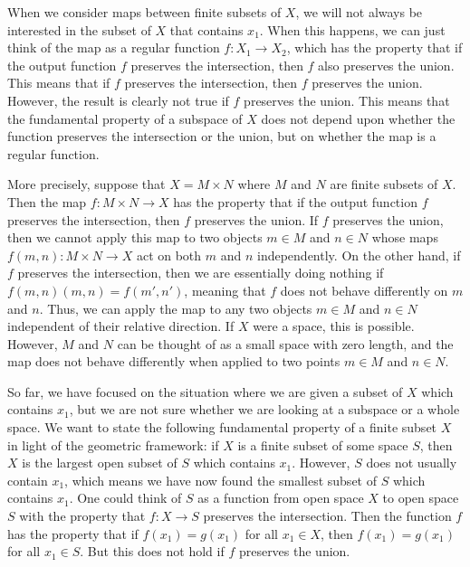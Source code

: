 \documentclass[a4paper,reqno,oneside]{article}
\begin{document}
When we consider maps between finite subsets of $X$, we will not always be interested in the subset of $X$ that contains $x_1$. When this happens, we can just think of the map as a regular function $f: X_1 \to X_2$, which has the property that if the output function $f$ preserves the intersection, then $f$ also preserves the union. This means that if $f$ preserves the intersection, then $f$ preserves the union. However, the result is clearly not true if $f$ preserves the union. This means that the fundamental property of a subspace of $X$ does not depend upon whether the function preserves the intersection or the union, but on whether the map is a regular function.  

More precisely, suppose that $X = M \times N$ where $M$ and $N$ are finite subsets of $X$. Then the map $f: M \times N \to X$ has the property that if the output function $f$ preserves the intersection, then $f$ preserves the union. If $f$ preserves the union, then we cannot apply this map to two objects $m \in M$ and $n \in N$ whose maps $f(m,n): M \times N \to X$ act on both $m$ and $n$ independently. On the other hand, if $f$ preserves the intersection, then we are essentially doing nothing if $f(m,n)(m,n) = f(m',n')$, meaning that $f$ does not behave differently on $m$ and $n$. Thus, we can apply the map to any two objects $m \in M$ and $n \in N$ independent of their relative direction. If $X$ were a space, this is possible. However, $M$ and $N$ can be thought of as a small space with zero length, and the map does not behave differently when applied to two points $m \in M$ and $n \in N$. 

So far, we have focused on the situation where we are given a subset of $X$ which contains $x_1$, but we are not sure whether we are looking at a subspace or a whole space. We want to state the following fundamental property of a finite subset $X$ in light of the geometric framework: if $X$ is a finite subset of some space $S$, then $X$ is the largest open subset of $S$ which contains $x_1$. However, $S$ does not usually contain $x_1$, which means we have now found the smallest subset of $S$ which contains $x_1$. One could think of $S$ as a function from open space $X$ to open space $S$ with the property that $f: X \to S$ preserves the intersection. Then the function $f$ has the property that if $f(x_1) = g(x_1)$ for all $x_1 \in X$, then $f(x_1) = g(x_1)$ for all $x_1 \in S$. But this does not hold if $f$ preserves the union. 
\end{document}
